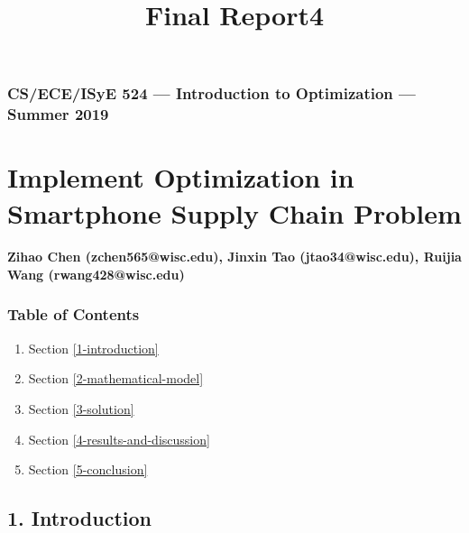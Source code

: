 \documentclass[11pt]{article}
\title{Final Report4}
\providecommand{\tightlist}{%
      \setlength{\itemsep}{0pt}\setlength{\parskip}{0pt}}
\begin{document}
    
    
    \maketitle
    
    

    
    \hypertarget{cseceisye-524-introduction-to-optimization-summer-2019}{%
\subsubsection{CS/ECE/ISyE 524 --- Introduction to Optimization ---
Summer
2019}\label{cseceisye-524-introduction-to-optimization-summer-2019}}

\hypertarget{implement-optimization-in-smartphone-supply-chain-problem}{%
\section{Implement Optimization in Smartphone Supply Chain
Problem}\label{implement-optimization-in-smartphone-supply-chain-problem}}

\hypertarget{zihao-chen-zchen565wisc.edu-jinxin-tao-jtao34wisc.edu-ruijia-wang-rwang428wisc.edu}{%
\paragraph{Zihao Chen (zchen565@wisc.edu), Jinxin Tao (jtao34@wisc.edu),
Ruijia Wang
(rwang428@wisc.edu)}\label{zihao-chen-zchen565wisc.edu-jinxin-tao-jtao34wisc.edu-ruijia-wang-rwang428wisc.edu}}

\hypertarget{table-of-contents}{%
\subsubsection{Table of Contents}\label{table-of-contents}}

\begin{enumerate}
\def\labelenumi{\arabic{enumi}.}
\tightlist
\item
  Section \ref{1-introduction}
\item
  Section \ref{2-mathematical-model}
\item
  Section \ref{3-solution}
\item
  Section \ref{4-results-and-discussion}
\item
  Section \ref{5-conclusion}
\end{enumerate}

    \hypertarget{introduction}{%
\subsection{1. Introduction}\label{introduction}}
\end{document}
